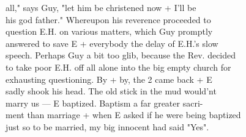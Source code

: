 \documentclass[11pt,a4paper]{article}
\begin{document}
{all," says Guy, "let him be christened now + I'll be \\
his god father." Whereupon his reverence proceeded to \\
question E.H. on various matters, which Guy promptly \\
answered to save E + everybody the delay of E.H.'s slow \\
speech. Perhaps Guy a bit too glib, because the Rev. decided \\
to take poor E.H. off all alone into the big empty church for \\
exhausting questioning. By + by, the 2 came back + E \\
sadly shook his head. The old stick in the mud would'nt \\
marry us --- E  baptized. Baptism a far greater sacri- \\
ment than marriage + when E  asked if he were being baptized \\
just so  to be married, my big innocent had said "Yes".}



\end{document}
